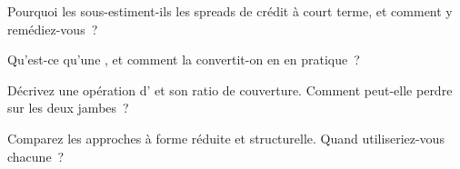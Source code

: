 \begin{interviewq}\label{iq:rc:structural-credit-models:3}
Pourquoi les  sous-estiment-ils les spreads de crédit à court terme, et comment y remédiez-vous~?
\end{interviewq}

\begin{interviewq}\label{iq:rc:structural-credit-models:4}
Qu'est-ce qu'une , et comment la convertit-on en  en
pratique~?
\end{interviewq}

\begin{interviewq}\label{iq:rc:structural-credit-models:5}
Décrivez une opération d' et son ratio de couverture. Comment peut-elle perdre sur
les deux jambes~?
\end{interviewq}

\begin{interviewq}\label{iq:rc:structural-credit-models:6}
Comparez les approches à forme réduite et structurelle. Quand utiliseriez-vous chacune~?
\end{interviewq}
